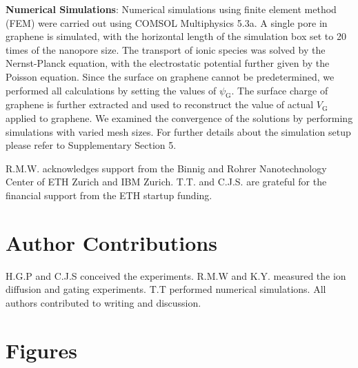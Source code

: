 \documentclass[journal=langd5,email=true, hyperref=true, keywords=false]{achemso}
\begin{document}
\vspace{1em}
\noindent
\textbf{Numerical Simulations}: Numerical simulations using finite
element method (FEM) were carried out using COMSOL Multiphysics
5.3a. A single pore in graphene is simulated, with the horizontal
length of the simulation box set to 20 times of the nanopore size. The
transport of ionic species was solved by the Nernst-Planck equation,
with the electrostatic potential further given by the Poisson
equation. Since the surface on graphene cannot be predetermined, we
performed all calculations by setting the values of
$\psi_{\mathrm{G}}$. The surface charge of graphene is further
extracted and used to reconstruct the value of actual $V_{\mathrm{G}}$
applied to graphene. We examined the convergence of the solutions by
performing simulations with varied mesh sizes. For further details
about the simulation setup please refer to Supplementary Section 5.


\begin{acknowledgement}
  R.M.W. acknowledges support from the Binnig and Rohrer
  Nanotechnology Center of ETH Zurich and IBM Zurich. T.T. and
  C.J.S. are grateful for the financial support from the ETH startup
  funding.
\end{acknowledgement}

\section{Author Contributions}
\label{sec:author}

H.G.P and C.J.S conceived the experiments. R.M.W and K.Y. measured the ion
diffusion and gating experiments. T.T performed numerical
simulations. All authors contributed to writing and discussion.


\section*{}
\label{sec:ref}


\clearpage
\section{Figures}
\label{sec:figs}
\end{document}
